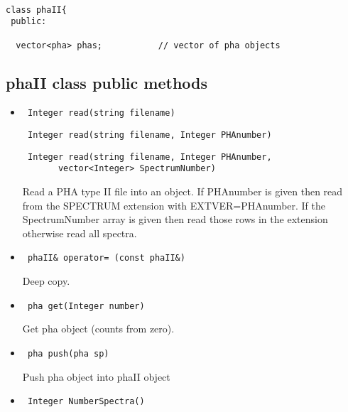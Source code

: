 \documentclass[11pt]{book}
\begin{document}
\begin{verbatim}

class phaII{
 public:

  vector<pha> phas;           // vector of pha objects

\end{verbatim}

\subsection{phaII class public methods}

\begin{itemize}

\item  \begin{verbatim} Integer read(string filename) \end{verbatim}
       \begin{verbatim} Integer read(string filename, Integer PHAnumber) \end{verbatim}
       \begin{verbatim} Integer read(string filename, Integer PHAnumber, 
       vector<Integer> SpectrumNumber) \end{verbatim}

           Read a PHA type II file into an object. If PHAnumber is
           given then read from the SPECTRUM extension with EXTVER=PHAnumber.
           If the SpectrumNumber array is given then read those rows
           in the extension otherwise read all spectra.

\item  \begin{verbatim} phaII& operator= (const phaII&) \end{verbatim}

           Deep copy.

\item  \begin{verbatim} pha get(Integer number) \end{verbatim}
  
           Get pha object (counts from zero).

\item  \begin{verbatim} pha push(pha sp) \end{verbatim}

           Push pha object into phaII object

\item  \begin{verbatim} Integer NumberSpectra() \end{verbatim}


\end{itemize}
\end{document}
